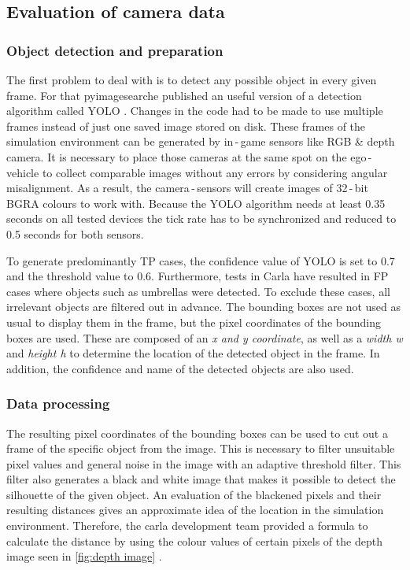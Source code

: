 \subsection{Evaluation of camera data}
\subsubsection{Object detection and preparation}
The first problem to deal with is to detect any possible object in every given frame. For that pyimagesearche published an useful version of a detection algorithm called \ac{YOLO} \cite{Yolo}. 
Changes in the code had to be made to use multiple frames instead of just one saved image stored on disk.
These frames of the simulation environment can be generated by in\,-\,game sensors like RGB \& depth camera. It is necessary to place those cameras at the same spot on the ego\,-\,vehicle to collect comparable images without any errors by considering angular misalignment. As a result, the camera\,-\,sensors will create images of 32\,-\,bit BGRA colours to work with. 
Because the \ac{YOLO} algorithm needs at least 0.35 seconds on all tested devices the tick rate has to be synchronized and reduced to 0.5 seconds for both sensors.

To generate predominantly \ac{TP} cases, the confidence value of \ac{YOLO} is set to 0.7 and the threshold value to 0.6. Furthermore, tests in Carla have resulted in \ac{FP} cases where objects such as umbrellas were detected. To exclude these cases, all irrelevant objects are filtered out in advance. The bounding boxes are not used as usual to display them in the frame, but the pixel coordinates of the bounding boxes are used. These are composed of an \textit{x and y coordinate}, as well as a \textit{width w} and \textit{height h} to determine the location of the detected object in the frame. In addition, the confidence and name of the detected objects are also used. 
\subsubsection{Data processing}
The resulting pixel coordinates of the bounding boxes can be used to cut out a frame of the specific object from the image. This is necessary to filter unsuitable pixel values and general noise in the image with an adaptive threshold filter. This filter also generates a black and white image that makes it possible to detect the silhouette of the given object. An evaluation of the blackened pixels and their resulting distances gives an approximate idea of the location in the simulation environment.
Therefore, the carla development team provided a formula to calculate the distance by using the colour values of certain pixels of the depth image seen in \cref{fig:depth image} \cite{distance}. 

